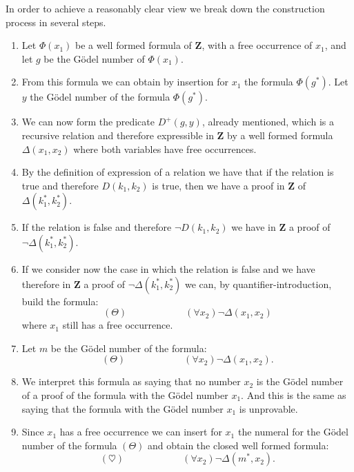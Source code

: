 \documentclass[12pt]{article}
\begin{document}
In order to achieve a reasonably clear view we break down the construction process in several steps.

\begin{enumerate}
\item Let $\Phi (x_1)$ be a well formed formula of $\textbf{Z}$, with a free occurrence of $x_1$, and let $g$ be the G\"{o}del number of $\Phi (x_1)$.

\item From this formula we can obtain by insertion for $x_1$ the formula $\Phi (g^*)$. Let $y$ the G\"{o}del number of the formula $\Phi (g^*)$.

\item We can now form the predicate $D^{+} (g, y)$, already mentioned, which is a recursive relation and therefore expressible in $\textbf{Z}$ by a well formed formula $\Delta (x_1, x_2)$ where both variables have free occurrences.

\item By the definition of expression of a relation we have that if the relation is true and therefore $D (k_1, k_2)$ is true, then we have a proof in $\textbf{Z}$ of $\Delta (k^*_1,k^*_2)$.

\item If the relation is false and therefore $\neg D (k_1, k_2)$ we have in $\textbf{Z}$ a proof of $\neg \Delta (k^*_1, k^*_2)$.

\item If we consider now the case in which the relation is false and we have therefore in $\textbf{Z}$ a proof of $\neg \Delta (k^*_1, k^*_2)$ we can, by quantifier-introduction, build the formula:
$$(\Theta) \hspace{6em} (\forall x_2) \neg \Delta (x_1, x_2)$$ 
where $x_1$ still has a free occurrence.

\item Let $m$ be the G\"{o}del number of the formula:
$$(\Theta) \hspace{6em} (\forall x_2) \neg \Delta (x_1, x_2).$$

\item We interpret this formula as saying that no number $x_2$ is the G\"{o}del number of a proof of the formula with the G\"{o}del number $x_1$. And this is the same as saying that the formula with the G\"{o}del number $x_1$ is unprovable.

\item Since $x_1$ has a free occurrence we can insert for $x_1$ the numeral for the G\"{o}del number of the formula $(\Theta)$ and obtain the closed well formed formula:
$$(\heartsuit) \hspace{6em} (\forall x_2) \neg \Delta (m^*, x_2).$$


\end{enumerate}
\end{document}
